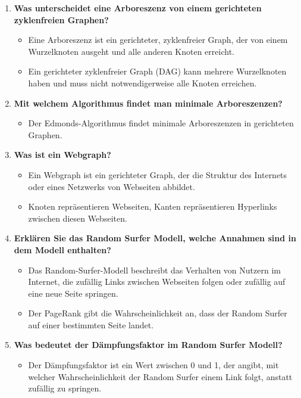 \documentclass[12pt]{scrartcl}
\begin{document}
\begin{enumerate}
          \pagebreak
    \item \textbf{Was unterscheidet eine Arboreszenz von einem gerichteten zyklenfreien Graphen?}
          \begin{itemize}
              \item Eine Arboreszenz ist ein gerichteter, zyklenfreier Graph, der von einem Wurzelknoten ausgeht und alle anderen Knoten erreicht.
              \item Ein gerichteter zyklenfreier Graph (DAG) kann mehrere Wurzelknoten haben und muss nicht notwendigerweise alle Knoten erreichen.
          \end{itemize}
    \item \textbf{Mit welchem Algorithmus findet man minimale Arboreszenzen?}
          \begin{itemize}
              \item Der Edmonds-Algorithmus findet minimale Arboreszenzen in gerichteten Graphen.
          \end{itemize}
    \item \textbf{Was ist ein Webgraph?}
          \begin{itemize}
              \item Ein Webgraph ist ein gerichteter Graph, der die Struktur des Internets oder eines Netzwerks von Webseiten abbildet.
              \item Knoten repräsentieren Webseiten, Kanten repräsentieren Hyperlinks zwischen diesen Webseiten.
          \end{itemize}
    \item \textbf{Erklären Sie das Random Surfer Modell, welche Annahmen sind in dem Modell enthalten?}
          \begin{itemize}
              \item Das Random-Surfer-Modell beschreibt das Verhalten von Nutzern im Internet, die zufällig Links zwischen Webseiten folgen oder zufällig auf eine neue Seite springen.
              \item Der PageRank gibt die Wahrscheinlichkeit an, dass der Random Surfer auf einer bestimmten Seite landet.
          \end{itemize}
    \item \textbf{Was bedeutet der Dämpfungsfaktor im Random Surfer Modell?}
          \begin{itemize}
              \item Der Dämpfungsfaktor ist ein Wert zwischen 0 und 1, der angibt, mit welcher Wahrscheinlichkeit der Random Surfer einem Link folgt, anstatt zufällig zu springen.

\end{itemize}
\end{enumerate}
\end{document}
